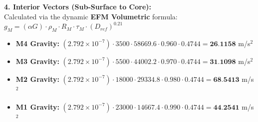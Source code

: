 \documentclass[11pt, a4paper]{article}
\begin{document}
  \vspace{0.5em}
  \noindent \textbf{4. Interior Vectors (Sub-Surface to Core):} \\[0.5em]
  \hspace*{1em} Calculated via the dynamic \textbf{EFM Volumetric} formula: $g_M = (\alpha G) \cdot \rho_{M} \cdot R_M \cdot \tau_M \cdot (D_{ref})^{0.21}$
  \begin{itemize}
    \item \textbf{M4 Gravity:} $(2.792 \times 10^{-7}) \cdot 3500 \cdot 58669.6 \cdot 0.960 \cdot 0.4744 = \textbf{26.1158}$ m/s$^2$
    \item \textbf{M3 Gravity:} $(2.792 \times 10^{-7}) \cdot 5500 \cdot 44002.2 \cdot 0.970 \cdot 0.4744 = \textbf{31.1098}$ m/s$^2$
    \item \textbf{M2 Gravity:} $(2.792 \times 10^{-7}) \cdot 18000 \cdot 29334.8 \cdot 0.980 \cdot 0.4744 = \textbf{68.5413}$ m/s$^2$
    \item \textbf{M1 Gravity:} $(2.792 \times 10^{-7}) \cdot 23000 \cdot 14667.4 \cdot 0.990 \cdot 0.4744 = \textbf{44.2541}$ m/s$^2$
  \end{itemize}
\end{document}
